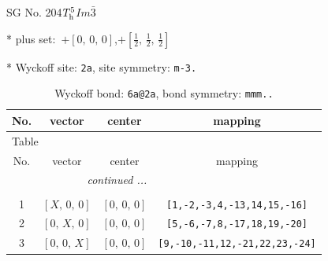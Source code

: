 \documentclass[fleqn,8pt]{jsarticle}
\begin{document}
\setcounter{MaxMatrixCols}{32}

\renewcommand{\tablename}{Table~}
\renewcommand{\figurename}{Figure~}
\begin{center}
\LARGE
SG No. 204\quad$T_{\rm h}^{5}$\quad$Im\bar{3}$\quad[ cubic ]
\end{center}

* plus set:\,\,\,$+\left[ 0,\, 0,\, 0 \right]$,\quad $+\left[ \frac{1}{2},\, \frac{1}{2},\, \frac{1}{2} \right]$


* Wyckoff site: {\tt 2a}, site symmetry: {\tt m-3.}
\renewcommand{\arraystretch}{1.2}
\begin{longtable}{cccc}
\caption{Wyckoff bond: {\tt 6a@2a}, bond symmetry: {\tt mmm..}}
 \\
 \hline \hline
No. & vector & center & mapping \\ \hline \endfirsthead

\multicolumn{3}{l}{\tablename\ \thetable{}} \\
 \hline \hline
No. & vector & center & mapping \\ \hline \endhead

 \hline \hline
\multicolumn{3}{r}{\footnotesize\it continued ...} \\ \endfoot

 \hline \hline
\multicolumn{3}{r}{} \\ \endlastfoot

1 & $\left[ X,\, 0,\, 0 \right]$ & $\left[ 0,\, 0,\, 0 \right]$ & {\tt [1,-2,-3,4,-13,14,15,-16]} \\ \hline
2 & $\left[ 0,\, X,\, 0 \right]$ & $\left[ 0,\, 0,\, 0 \right]$ & {\tt [5,-6,-7,8,-17,18,19,-20]} \\ \hline
3 & $\left[ 0,\, 0,\, X \right]$ & $\left[ 0,\, 0,\, 0 \right]$ & {\tt [9,-10,-11,12,-21,22,23,-24]} \\
\end{longtable}
\renewcommand{\arraystretch}{1.2}
\end{document}
